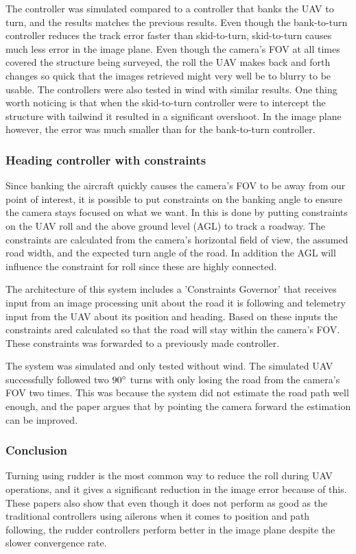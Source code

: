 The controller was simulated compared to a controller that banks the UAV to turn, and the results matches the previous results. Even though the bank-to-turn controller reduces the track error faster than skid-to-turn, skid-to-turn causes much less error in the image plane. Even though the camera's FOV at all times covered the structure being surveyed, the roll the UAV makes back and forth changes so quick that the images retrieved might very well be to blurry to be usable. The controllers were also tested in wind with similar results. One thing worth noticing is that when the skid-to-turn controller were to intercept the structure with tailwind it resulted in a significant overshoot. In the image plane however, the error was much smaller than for the bank-to-turn controller.


\subsubsection{Heading controller with constraints}
Since banking the aircraft quickly causes the camera's FOV to be away from our point of interest, it is possible to put constraints on the banking angle to ensure the camera stays focused on what we want. In \cite{constraintsEGBERT} this is done by putting constraints on the UAV roll and the above ground level (AGL) to track a roadway. The constraints are calculated from the camera's horizontal field of view, the assumed road width, and the expected turn angle of the road. In addition the AGL will influence the constraint for roll since these are highly connected.

The architecture of this system includes a 'Constraints Governor' that receives input from an image processing unit about the road it is following and telemetry input from the UAV about its position and heading. Based on these inputs the constraints ared calculated so that the road will stay within the camera's FOV. These constraints was forwarded to a previously made controller.

The system was simulated and only tested without wind. The simulated UAV successfully followed two $90 \degree$ turns with only losing the road from the camera's FOV two times. This was because the system did not estimate the road path well enough, and the paper argues that by pointing the camera forward the estimation can be improved.


\subsubsection{Conclusion}
Turning using rudder is the most common way to reduce the roll during UAV operations, and it gives a significant reduction in the image error because of this. These papers also show that even though it does not perform as good as the traditional controllers using ailerons when it comes to position and path following, the rudder controllers perform better in the image plane despite the slower convergence rate.

